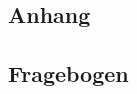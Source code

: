 
\begin{appendices}
\renewcommand{\appendixname}{ANHANG}
\renewcommand{\appendixtocname}{\appendixname} 
\addappheadtotoc 


\part*{Anhang}

\chapter{Fragebogen}
\label{anh:fragebogen}

\begin{figure}[!htb]

\end{figure}



\end{appendices}